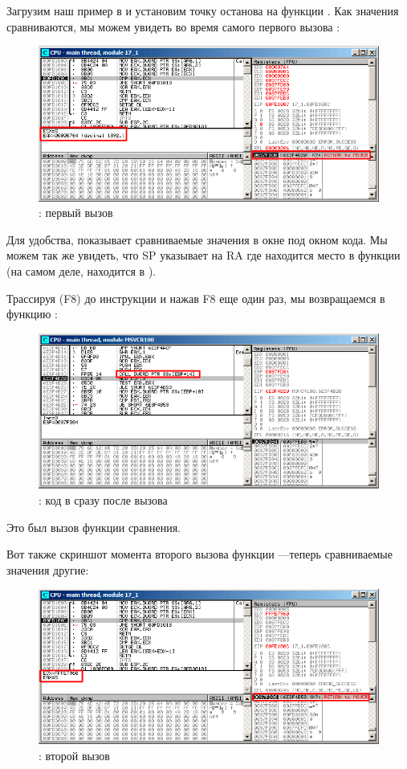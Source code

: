 ﻿\clearpage
{}
\myindex{\olly}

Загрузим наш пример в \olly и установим точку останова на функции \comp{}.
Как значения сравниваются, мы можем увидеть во время самого первого вызова \comp{}:

\begin{figure}[H]
\centering
\includegraphics[scale=\FigScale]{patterns/18_pointers_to_functions/olly1.png}
\caption{\olly: первый вызов \comp}
\label{fig:qsort_olly1}
\end{figure}

Для удобства, \olly показывает сравниваемые значения в окне под окном кода.
Мы можем так же увидеть, что \ac{SP} указывает на \ac{RA} где находится место в функции \qsort (на самом деле, находится в ).

\clearpage
Трассируя (F8) до инструкции  и нажав F8 еще один раз, мы возвращаемся в функцию \qsort:

\begin{figure}[H]
\centering
\includegraphics[scale=\FigScale]{patterns/18_pointers_to_functions/olly2.png}
\caption{\olly: код в \qsort сразу после вызова \comp}
\label{fig:qsort_olly2}
\end{figure}

Это был вызов функции сравнения.

\clearpage
Вот также скриншот момента второго вызова функции \comp{}---теперь сравниваемые значения другие:

\begin{figure}[H]
\centering
\includegraphics[scale=\FigScale]{patterns/18_pointers_to_functions/olly3.png}
\caption{\olly: второй вызов \comp}
\label{fig:qsort_olly3}
\end{figure}

